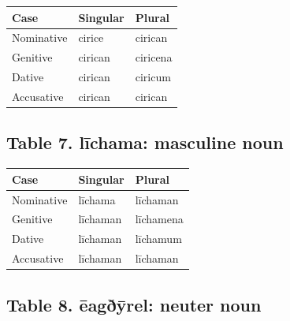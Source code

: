 \par\begingroup
\fontsize{10.5}{13.2}\selectfont
\setlength{\LTleft}{0pt}\setlength{\LTright}{\fill}
\noindent
\begin{tabular}{@{}>{\raggedright\arraybackslash}p{39.46mm}>{\raggedright\arraybackslash}p{39.46mm}>{\raggedright\arraybackslash}p{39.46mm}@{}}
\toprule
\textbf{Case} & \textbf{Singular} & \textbf{Plural} \\
\midrule
Nominative & cirice & cirican \\
Genitive & cirican & ciricena \\
Dative & cirican & ciricum \\
Accusative & cirican & cirican \\
\bottomrule
\end{tabular}
\par\endgroup

\subsection*{Table 7. līchama: masculine noun}

\par\begingroup
\fontsize{10.5}{13.2}\selectfont
\setlength{\LTleft}{0pt}\setlength{\LTright}{\fill}
\noindent
\begin{tabular}{@{}>{\raggedright\arraybackslash}p{39.46mm}>{\raggedright\arraybackslash}p{39.46mm}>{\raggedright\arraybackslash}p{39.46mm}@{}}
\toprule
\textbf{Case} & \textbf{Singular} & \textbf{Plural} \\
\midrule
Nominative & līchama & līchaman \\
Genitive & līchaman & līchamena \\
Dative & līchaman & līchamum \\
Accusative & līchaman & līchaman \\
\bottomrule
\end{tabular}
\par\endgroup

\subsection*{Table 8. ēagðȳrel: neuter noun}

